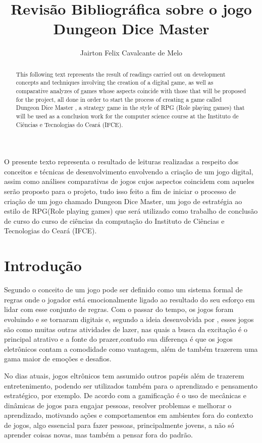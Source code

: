 \documentclass[12pt]{article}
\title{Revisão Bibliográfica sobre o jogo Dungeon Dice Master}
\author{Jairton Felix Cavalcante de Melo\inst{1} }
\begin{document}
 

\maketitle

\begin{abstract}
  This following text represents the result of readings carried out on development concepts and techniques involving the creation of a digital game, as well as comparative analyzes of games whose aspects coincide with those that will be proposed for the project, all done in order to start the process of creating a game called Dungeon Dice Master , a strategy game in the style of RPG (Role playing games) that will be used as a conclusion work for the computer science course at the Instituto de Ciências e Tecnologias do Ceará (IFCE).
\end{abstract}
     
\begin{resumo} 
 O presente texto representa o resultado de leituras realizadas a respeito dos conceitos e técnicas de desenvolvimento envolvendo a criação de um jogo digital, assim como análises comparativas de jogos cujos aspectos coincidem com aqueles serão proposto para o projeto, tudo isso feito a fim de iniciar o processo de criação de um jogo  chamado Dungeon Dice Master, um jogo de estratégia ao estilo de RPG(Role playing games) que será utilizado como trabalho de conclusão de curso do curso de ciências da computação do Instituto de Ciências e Tecnologias do Ceará (IFCE).
\end{resumo}


\section{Introdução}

Segundo o conceito de \cite{loureirodesign} um jogo pode ser definido como um sistema formal de regras onde o jogador está emocionalmente ligado ao resultado do seu esforço em lidar com esse conjunto de regras. Com o passar do tempo, os jogos foram evoluindo e se tornaram digitais e, segundo a ideia desenvolvida por \cite{de2008jogos}, esses jogos são como muitas outras atividades de lazer, nas quais a busca da excitação é o principal atrativo e a fonte do prazer,contudo sua diferença é que os jogos eletrônicos contam a comodidade como vantagem, além de também trazerem uma gama maior de emoções e desafios.

No dias atuais, jogos eltrônicos tem assumido outros papéis além de trazerem entretenimento, podendo ser utilizados também para o aprendizado e pensamento estratégico, por exemplo. De acordo com \cite{gamif} a gamificação é o uso de mecânicas e dinâmicas de jogos para engajar pessoas, resolver problemas e melhorar o aprendizado, motivando ações e comportamentos em ambientes fora do contexto de jogos, algo essencial para fazer pessoas, principalmente jovens, a não só aprender coisas novas, mas também a pensar fora do padrão.
\end{document}
